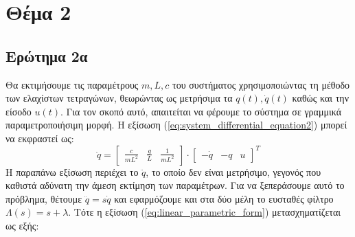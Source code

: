 \documentclass[a4paper,12pt]{article}
\begin{document}
\section*{Θέμα 2}
\subsection*{Ερώτημα 2α}
Θα εκτιμήσουμε τις παραμέτρους $m, L, c$ του συστήματος χρησιμοποιώντας τη μέθοδο των ελαχίστων τετραγώνων, θεωρώντας ως μετρήσιμα τα $q(t), \dot{q}(t)$ καθώς και την είσοδο $u(t)$. Για τον σκοπό αυτό, απαιτείται να φέρουμε το σύστημα σε γραμμικά παραμετροποιήσιμη μορφή. Η εξίσωση (\ref{eq:system_differential_equation2}) μπορεί να εκφραστεί ως:
\begin{equation}
    \ddot{q} =
    \left[
    \begin{matrix}
        \frac{c}{mL^2} & \frac{g}{L} & \frac{1}{mL^2}
    \end{matrix}
    \right]
    \cdot
    \left[
    \begin{matrix}
        -\dot{q} & -q & u
    \end{matrix}
    \right]^T
    \label{eq:linear_parametric_form}
\end{equation}
Η παραπάνω εξίσωση περιέχει το $\ddot{q}$, το οποίο δεν είναι μετρήσιμο, γεγονός που καθιστά αδύνατη την άμεση εκτίμηση των παραμέτρων. Για να ξεπεράσουμε αυτό το πρόβλημα, θέτουμε $\ddot{q} = s\dot{q}$ και εφαρμόζουμε και στα δύο μέλη το ευσταθές φίλτρο $\Lambda(s) = s + \lambda$. Τότε η εξίσωση (\ref{eq:linear_parametric_form}) μετασχηματίζεται ως εξής:
\end{document}
